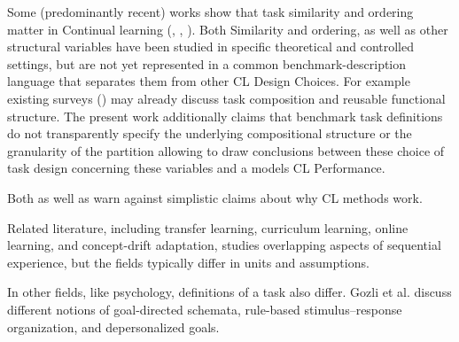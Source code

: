 \documentclass{article}
\begin{document}
        

        Some (predominantly recent) works show that task similarity and ordering matter in Continual learning (\cite{hiratani2024disentangling}, \cite{menghi2025impact} \cite{doan2021theoretical}, \cite{li2025optimal}). 
        Both Similarity and ordering, as well as other structural variables have been studied in specific theoretical and controlled settings, but are not yet represented in a common benchmark-description language that separates them from other CL Design Choices. 
        For example existing surveys (\cite{mendez2022reuse}) may already discuss task composition and reusable functional structure. The present work additionally claims that benchmark task definitions do not transparently specify the underlying compositional structure or the granularity of the partition allowing to draw conclusions between these choice of task design concerning these variables and a models CL Performance. 
        
        Both \cite{ostapenko2022continual} as well as \cite{thede2024reflecting} warn against simplistic claims about why CL methods work. %


        Related literature, including transfer learning, curriculum learning, online learning, and concept-drift adaptation, studies overlapping aspects of sequential experience, but the fields typically differ in units and assumptions.

        In other fields, like psychology, definitions of a task also differ. Gozli et al. \cite{Gozli2019-GOZWIA} discuss different notions of goal-directed schemata, rule-based stimulus–response organization, and depersonalized goals.
        
\end{document}
